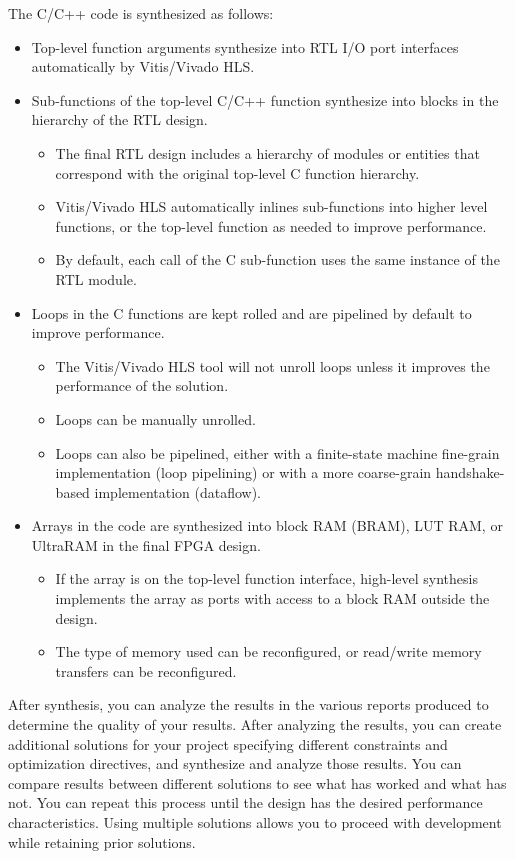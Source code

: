 \par The C/C++ code is synthesized as follows:
\begin{itemize}
  \item Top-level function arguments synthesize into RTL I/O port interfaces automatically by Vitis/Vivado HLS. 
  \item Sub-functions of the top-level C/C++ function synthesize into blocks in the hierarchy of the RTL design.
  \begin{itemize}
    \item The final RTL design includes a hierarchy of modules or entities that correspond with the original top-level C function hierarchy.
    \item Vitis/Vivado HLS automatically inlines sub-functions into higher level functions, or the top-level function as needed to improve performance.
    \item By default, each call of the C sub-function uses the same instance of the RTL module.
  \end{itemize}
  \item Loops in the C functions are kept rolled and are pipelined by default to improve performance.
  \begin{itemize}
    \item The Vitis/Vivado HLS tool will not unroll loops unless it improves the performance of the solution. 
    \item Loops can be manually unrolled.
    \item Loops can also be pipelined, either with a finite-state machine fine-grain implementation (loop pipelining) or with a more coarse-grain handshake-based implementation (dataflow).
  \end{itemize}
  \item Arrays in the code are synthesized into block RAM (BRAM), LUT RAM, or UltraRAM in the final FPGA design.
  \begin{itemize}
      \item If the array is on the top-level function interface, high-level synthesis implements the array as ports with access to a block RAM outside the design.
      \item The type of memory used can be reconfigured, or read/write memory transfers can be reconfigured.
  \end{itemize}
\end{itemize}

After synthesis, you can analyze the results in the various reports produced to determine the quality of your results. After analyzing the results, you can create additional solutions for your
project specifying different constraints and optimization directives, and synthesize and analyze
those results. You can compare results between different solutions to see what has worked and
what has not. You can repeat this process until the design has the desired performance
characteristics. Using multiple solutions allows you to proceed with development while retaining
prior solutions.


